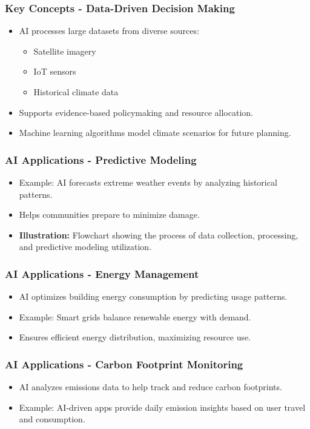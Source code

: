 \documentclass[aspectratio=169]{beamer}
\begin{document}
\begin{frame}[fragile]
    \frametitle{Key Concepts - Data-Driven Decision Making}
    \begin{itemize}
        \item AI processes large datasets from diverse sources: 
        \begin{itemize}
            \item Satellite imagery
            \item IoT sensors
            \item Historical climate data
        \end{itemize}
        \item Supports evidence-based policymaking and resource allocation.
        \item Machine learning algorithms model climate scenarios for future planning.
    \end{itemize}
\end{frame}

\begin{frame}[fragile]
    \frametitle{AI Applications - Predictive Modeling}
    \begin{itemize}
        \item Example: AI forecasts extreme weather events by analyzing historical patterns.
        \item Helps communities prepare to minimize damage.
        \item \textbf{Illustration:} Flowchart showing the process of data collection, processing, and predictive modeling utilization.
    \end{itemize}
\end{frame}

\begin{frame}[fragile]
    \frametitle{AI Applications - Energy Management}
    \begin{itemize}
        \item AI optimizes building energy consumption by predicting usage patterns.
        \item Example: Smart grids balance renewable energy with demand.
        \item Ensures efficient energy distribution, maximizing resource use.
    \end{itemize}
\end{frame}

\begin{frame}[fragile]
    \frametitle{AI Applications - Carbon Footprint Monitoring}
    \begin{itemize}
        \item AI analyzes emissions data to help track and reduce carbon footprints.
        \item Example: AI-driven apps provide daily emission insights based on user travel and consumption.
    \end{itemize}
\end{frame}
\end{document}
